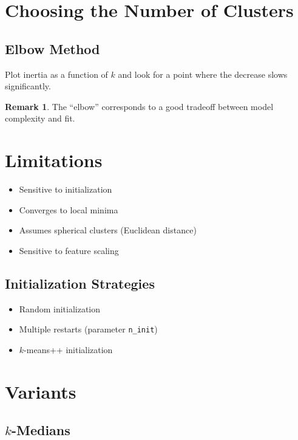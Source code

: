 \documentclass[12pt,oneside]{book}
\numberwithin{equation}{section}
\theoremstyle{definition}
\newtheorem{remark}{Remark}[section]
\theoremstyle{plain}
\theoremstyle{remark}
\begin{document}
\section{Choosing the Number of Clusters}

\subsection{Elbow Method}

Plot inertia as a function of $k$ and look for a point where the decrease slows significantly.

\begin{remark}
The ``elbow'' corresponds to a good tradeoff between model complexity and fit.
\end{remark}

\section{Limitations}

\begin{itemize}
    \item Sensitive to initialization
    \item Converges to local minima
    \item Assumes spherical clusters (Euclidean distance)
    \item Sensitive to feature scaling
\end{itemize}

\subsection{Initialization Strategies}

\begin{itemize}
    \item Random initialization
    \item Multiple restarts (parameter \texttt{n\_init})
    \item $k$-means++ initialization
\end{itemize}

\section{Variants}

\subsection{$k$-Medians}
\end{document}
